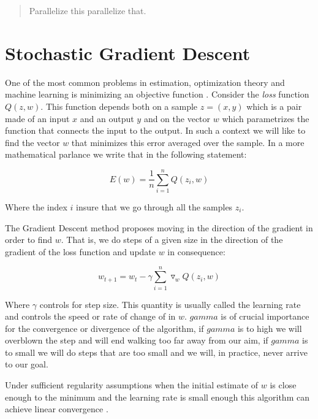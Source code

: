 \documentclass[11pt,a4paper]{article}
\begin{document}
\begin{abstract}
Parallelize this parallelize that.

\end{abstract}

\section{Stochastic Gradient Descent}

One of the most common problems in estimation, optimization theory and machine learning is minimizing an objective function \citep{bottou2010large}. Consider the \textit{loss} function $Q(z, w)$. This function depends both on a sample $z=(x, y)$ which is a pair made of an input $x$ and an output $y$ and on the vector $w$ which parametrizes the function that connects the input to the output. In such a context we will like to find the vector $w$ that minimizes this error averaged over the sample. In a more mathematical parlance we write that in the following statement:

\begin{equation}
E(w) = \frac{1}{n} \sum_{i=1}^n Q(z_i, w)
\end{equation}

Where the index $i$ insure that we go through all the samples $z_i$. 

The Gradient Descent method proposes moving in the direction of the gradient in order to find $w$. That is, we do steps of a given size in the direction of the gradient of the loss function and update $w$ in consequence:

\begin{equation}
w_{t + 1} = w_t - \gamma \sum_{i=1}^n \triangledown_w Q(z_i, w)
\end{equation}

Where $\gamma$ controls for step size. This quantity is usually called the learning rate and controls the speed or rate of change of in $w$. $gamma$ is of crucial
importance for the convergence or divergence of the algorithm, if $gamma$ is to high we will overblown the step and will end walking too far away from our aim, if $gamma$ is to small we will do steps that are too small and we will, in practice, never arrive to our goal. 

Under sufficient regularity assumptions when the initial estimate of $w$ is close enough to the minimum and the learning rate is small enough this algorithm can achieve linear convergence \citep{dennis1996numerical}. 
\end{document}
